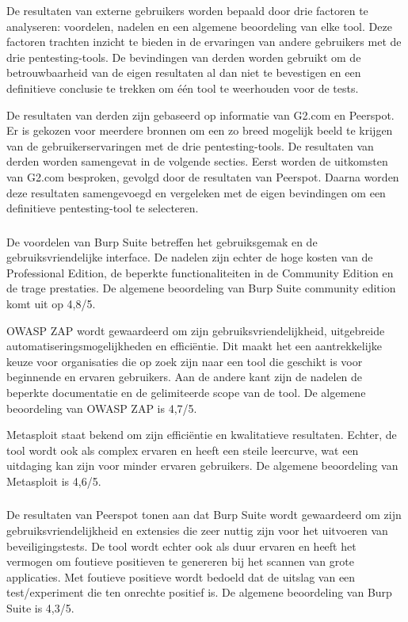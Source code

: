 De resultaten van externe gebruikers worden bepaald door drie factoren te analyseren: voordelen, nadelen en een algemene 
beoordeling van elke tool. Deze factoren trachten inzicht te bieden in de ervaringen van andere gebruikers met de drie pentesting-tools. 
De bevindingen van derden worden gebruikt om de betrouwbaarheid van de eigen resultaten al dan niet te bevestigen en een definitieve conclusie 
te trekken om één tool te weerhouden voor de tests.

De resultaten van derden zijn gebaseerd op informatie van G2.com en Peerspot. Er is gekozen voor meerdere bronnen om een zo 
breed mogelijk beeld te krijgen van de gebruikerservaringen met de drie pentesting-tools. De resultaten van derden worden 
samengevat in de volgende secties. Eerst worden de uitkomsten van G2.com besproken, gevolgd door de resultaten van Peerspot. 
Daarna worden deze resultaten samengevoegd en vergeleken met de eigen bevindingen om een definitieve pentesting-tool te 
selecteren.

\subsubsection{}
De voordelen van Burp Suite betreffen het gebruiksgemak en de gebruiksvriendelijke interface. De nadelen zijn echter 
de hoge kosten van de Professional Edition, de beperkte functionaliteiten in de Community Edition en de trage prestaties. De 
algemene beoordeling van Burp Suite community edition komt uit op 4,8/5.

OWASP ZAP wordt gewaardeerd om zijn gebruiksvriendelijkheid, uitgebreide automatiseringsmogelijkheden en efficiëntie. 
Dit maakt het een aantrekkelijke keuze voor organisaties die op zoek zijn naar een tool die geschikt is voor beginnende en 
ervaren gebruikers. Aan de andere kant zijn de nadelen de beperkte documentatie en de gelimiteerde scope van de tool. De 
algemene beoordeling van OWASP ZAP is 4,7/5.

Metasploit staat bekend om zijn efficiëntie en kwalitatieve resultaten. Echter, de tool wordt ook als complex ervaren en 
heeft een steile leercurve, wat een uitdaging kan zijn voor minder ervaren gebruikers. De algemene beoordeling van Metasploit 
is 4,6/5.

\subsubsection{}
De resultaten van Peerspot tonen aan dat Burp Suite wordt gewaardeerd om zijn gebruiksvriendelijkheid en extensies die zeer 
nuttig zijn voor het uitvoeren van beveiligingstests. De tool wordt echter ook als duur ervaren en heeft het vermogen om foutieve 
positieven te genereren bij het scannen van grote applicaties. Met foutieve positieve wordt bedoeld dat de uitslag van een 
test/experiment die ten onrechte positief is. De algemene beoordeling van Burp Suite is 4,3/5.

